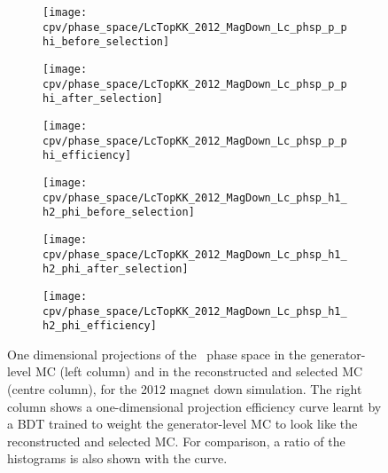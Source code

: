 \begin{figure}
  \begin{subfigure}{0.25\textwidth}
    \texttt{[image: cpv/phase\_space/LcTopKK\_2012\_MagDown\_Lc\_phsp\_p\_phi\_before\_selection]}
    \label{fig:cpv:phsp:effs:pKK:Lc_phsp_p_phi:before}
  \end{subfigure}
  \begin{subfigure}{0.25\textwidth}
    \texttt{[image: cpv/phase\_space/LcTopKK\_2012\_MagDown\_Lc\_phsp\_p\_phi\_after\_selection]}
    \label{fig:cpv:phsp:effs:pKK:Lc_phsp_p_phi:after}
  \end{subfigure}
  \begin{subfigure}{0.25\textwidth}
    \texttt{[image: cpv/phase\_space/LcTopKK\_2012\_MagDown\_Lc\_phsp\_p\_phi\_efficiency]}
    \label{fig:cpv:phsp:effs:pKK:Lc_phsp_p_phi:eff}
  \end{subfigure}

  \begin{subfigure}{0.25\textwidth}
    \texttt{[image: cpv/phase\_space/LcTopKK\_2012\_MagDown\_Lc\_phsp\_h1\_h2\_phi\_before\_selection]}
    \label{fig:cpv:phsp:effs:pKK:Lc_phsp_h1_h2_phi:before}
  \end{subfigure}
  \begin{subfigure}{0.25\textwidth}
    \texttt{[image: cpv/phase\_space/LcTopKK\_2012\_MagDown\_Lc\_phsp\_h1\_h2\_phi\_after\_selection]}
    \label{fig:cpv:phsp:effs:pKK:Lc_phsp_h1_h2_phi:after}
  \end{subfigure}
  \begin{subfigure}{0.25\textwidth}
    \texttt{[image: cpv/phase\_space/LcTopKK\_2012\_MagDown\_Lc\_phsp\_h1\_h2\_phi\_efficiency]}
    \label{fig:cpv:phsp:effs:pKK:Lc_phsp_h1_h2_phi:eff}
  \end{subfigure}

  \caption{%
    One dimensional projections of the \LcTopKK\ phase space in the 
    generator-level \ac{MC} (left column) and in the reconstructed and selected 
    \ac{MC} (centre column), for the 2012 magnet down simulation.
    The right column shows a one-dimensional projection efficiency curve learnt 
    by a \ac{BDT} trained to weight the generator-level \ac{MC} to look like 
    the reconstructed and selected \ac{MC}.
    For comparison, a ratio of the histograms is also shown with the curve.
  }
  \label{fig:cpv:phsp:effs:pKK}
\end{figure}

